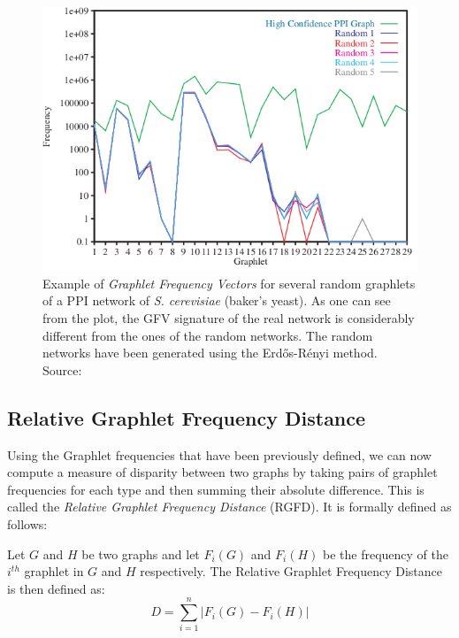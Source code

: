 \begin{figure}[h]
  \centering
\includegraphics[scale=0.9]{images/gdv-er-interactome.png}
\caption[Graphlet Frequency Vectors for S. cerevisiae PPI network]{Example of \emph{Graphlet Frequency Vectors} for several random graphlets of a PPI network of
\emph{S. cerevisiae} (baker's yeast). As one can see from the plot, the GFV
signature of the real network is considerably different from the ones of the
random networks. The random networks have been generated using the Erd\H{o}s-R\'{e}nyi
method. Source: \cite{prvzulj2004modeling}}
\label{fig:gdv_er}
\end{figure}

\subsection{Relative Graphlet Frequency Distance}
\label{sec:rgfd}

Using the Graphlet frequencies that have been previously defined, we can now
compute a measure of disparity between two graphs by taking pairs of
graphlet frequencies for each type and then summing their absolute difference.
This is called the \emph{Relative Graphlet Frequency Distance} (RGFD). It is formally defined as follows:

\begin{mydef}
\label{def:rgfd}
Let $G$ and $H$ be two graphs and let \(F_i(G)\) and
\(F_i(H)\) be the frequency of the $i^{th}$ graphlet in $G$ and $H$ respectively. The Relative Graphlet Frequency Distance is then defined as:
$$  D = \sum_{i=1}^{n}| F_i(G) - F_i(H) | $$
\end{mydef}


